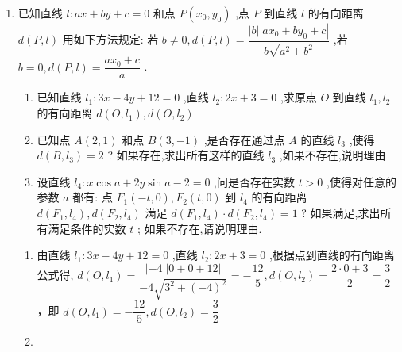 \begin{enumerate}
    \item 已知直线 $l : {ax} + {by} + c = 0$ 和点 $P\left( {{x}_{0},{y}_{0}}\right)$ ,点 $P$ 到直线 $l$ 的有向距离 $d\left( {P,l}\right)$ 用如下方法规定: 若 $b \neq  0,d\left( {P,l}\right)  = \dfrac{\left| b\right| \left| {a{x}_{0} + b{y}_{0} + c}\right| }{b\sqrt{{a}^{2} + {b}^{2}}}$ ,若 $b = 0,d\left( {P,l}\right)  = \dfrac{a{x}_{0} + c}{a}$ .
    \begin{enumerate}
        \item 已知直线 ${l}_{1} : {3x} - {4y} + {12} = 0$ ,直线 ${l}_{2} : {2x} + 3 = 0$ ,求原点 $O$ 到直线 ${l}_{1},{l}_{2}$ 的有向距离 $d\left( {O,{l}_{1}}\right) ,d\left( {O,{l}_{2}}\right)$
        \item 已知点 $A\left( {2,1}\right)$ 和点 $B\left( {3, - 1}\right)$ ,是否存在通过点 ${A}$ 的直线 ${l}_{3}$ ,使得 $d\left( {B,{l}_{3}}\right)  = 2$ ? 如果存在,求出所有这样的直线 ${l}_{3}$ ,如果不存在,说明理由
        \item 设直线 ${l}_{4} : x\cos a + {2y}\sin a - 2 = 0$ ,问是否存在实数 $t > 0$ ,使得对任意的参数 $a$ 都有: 点 ${F}_{1}\left( {-t,0}\right) ,{F}_{2}\left( {t,0}\right)$ 到 ${l}_{4}$ 的有向距离 $d\left( {{F}_{1},{l}_{4}}\right) ,d\left( {{F}_{2},{l}_{4}}\right)$ 满足 $d\left( {{F}_{1},{l}_{4}}\right)  \cdot  d\left( {{F}_{2},{l}_{4}}\right)  = 1$ ? 如果满足,求出所有满足条件的实数 $t$ ; 如果不存在,请说明理由.
    \end{enumerate}
    \begin{jieda}
        \begin{enumerate}
            \item 由直线 ${l}_{1} : {3x} - {4y} + {12} = 0$ ,直线 ${l}_{2} : {2x} + 3 = 0$ ,根据点到直线的有向距离公式得, $d\left( {O,{l}_{1}}\right)  = \dfrac{\left| {-4}\right| \left| {0 + 0 + {12}}\right| }{-4\sqrt{{3}^{2} + {\left( -4\right) }^{2}}} =  - \dfrac{12}{5},d\left( {O,{l}_{2}}\right)  = \dfrac{2 \cdot  0 + 3}{2} = \dfrac{3}{2}$，即 $d\left( {O,{l}_{1}}\right)  =  - \dfrac{12}{5},d\left( {O,{l}_{2}}\right)  = \dfrac{3}{2}$
            
            \item 
\end{enumerate}
\end{jieda}
\end{enumerate}
